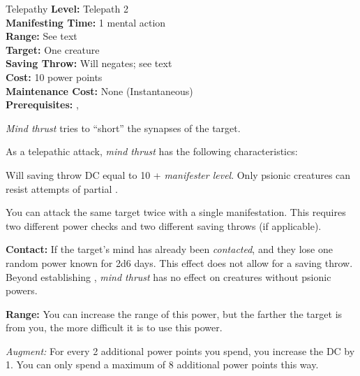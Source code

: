 {Telepathy}
{
	\textbf{Level:}
	Telepath 2\\
	\textbf{Manifesting Time:}
	1 mental action\\
	\textbf{Range:}
	See text\\
	\textbf{Target:}
	One creature\\
	\textbf{Saving Throw:}
	Will negates; see text\\
	\textbf{Cost:}
	10 power points\\
	\textbf{Maintenance Cost:}
	None (Instantaneous)\\
	\textbf{Prerequisites:}
	, \\
}
{
	\emph{Mind thrust} tries to ``short'' the synapses of the target.

	As a telepathic attack, \emph{mind thrust} has the following characteristics:
	\begin{itemize*}
		\item Will saving throw DC equal to 10 + \textit{manifester level}. Only psionic creatures can resist attempts of partial .
		\item You can attack the same target twice with a single manifestation. This requires two different power checks and two different saving throws (if applicable).
	\end{itemize*}

	\textbf{Contact:} If the target's mind has already been \emph{contacted}, and they lose one random power known for 2d6 days. This effect does not allow for a saving throw. Beyond establishing , \emph{mind thrust} has no effect on creatures without psionic powers.
	
	\textbf{Range:} You can increase the range of this power, but the farther the target is from you, the more difficult it is to use this power.


	\textit{Augment:} For every 2 additional power points you spend, you increase the DC by 1. You can only spend a maximum of 8 additional power points this way.
}
